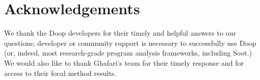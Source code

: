 \documentclass[conference]{IEEEtran}
\begin{document}
\section*{Acknowledgements} \tiny We thank the Doop developers for their timely and helpful answers to our questions; developer or community support is necessary to successfully use Doop (or, indeed, most research-grade program analysis frameworks, including Soot.)
We would also like to thank Ghafari's team for their timely response and for access to their focal method results. 





%
\end{document}
